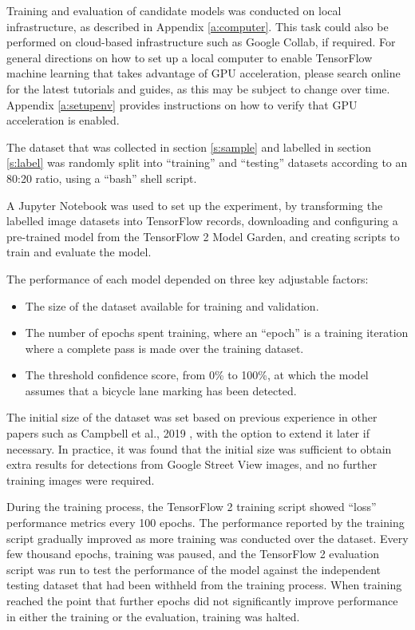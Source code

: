 \documentclass[11pt,twoside]{report}
\begin{document}
Training and evaluation of candidate models was conducted on local infrastructure, as described in Appendix \ref{a:computer}.  This task could also be performed on cloud-based infrastructure such as Google Collab, if required.  For general directions on how to set up a local computer to enable TensorFlow machine learning that takes advantage of GPU acceleration, please search online for the latest tutorials and guides, as this may be subject to change over time.  Appendix \ref{a:setupenv} provides instructions on how to verify that GPU acceleration is enabled.

The dataset that was collected in section \ref{s:sample} and labelled in section \ref{s:label} was randomly split into ``training'' and ``testing'' datasets according to an 80:20 ratio, using a ``bash'' shell script.

A Jupyter Notebook was used to set up the experiment, by transforming the labelled image datasets into TensorFlow records, downloading and configuring a pre-trained model from the TensorFlow 2 Model Garden, and creating scripts to train and evaluate the model.

The performance of each model depended on three key adjustable factors:

\begin{itemize}
\item{The size of the dataset available for training and validation.}
\item{The number of epochs spent training, where an ``epoch'' is a training iteration where a complete pass is made over the training dataset.}
\item{The threshold confidence score, from 0\% to 100\%, at which the model assumes that a bicycle lane marking has been detected.}
\end{itemize}

The initial size of the dataset was set based on previous experience in other papers such as Campbell et al., 2019 \cite{CAMPBELL2019101350}, with the option to extend it later if necessary.  In practice, it was found that the initial size was sufficient to obtain extra results for detections from Google Street View images, and no further training images were required.

During the training process, the TensorFlow 2 training script showed ``loss'' performance metrics every 100 epochs.  The performance reported by the training script gradually improved as more training was conducted over the dataset.  Every few thousand epochs, training was paused, and the TensorFlow 2 evaluation script was run to test the performance of the model against the independent testing dataset that had been withheld from the training process.  When training reached the point that further epochs did not significantly improve performance in either the training or the evaluation, training was halted.
\end{document}
